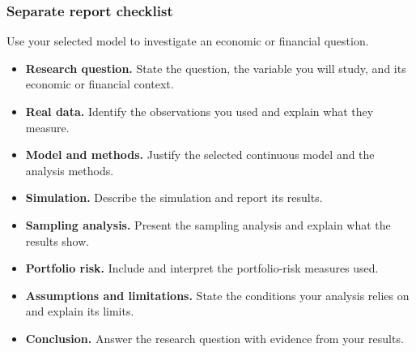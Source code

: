 \subsubsection*{Separate report checklist}
Use your selected model to investigate an economic or financial question.
\begin{itemize}[label=\(\square\),leftmargin=1.65em,itemsep=5pt]
  \item \textbf{Research question.} State the question, the variable you will study, and its economic or financial context.
  \item \textbf{Real data.} Identify the observations you used and explain what they measure.
  \item \textbf{Model and methods.} Justify the selected continuous model and the analysis methods.
  \item \textbf{Simulation.} Describe the simulation and report its results.
  \item \textbf{Sampling analysis.} Present the sampling analysis and explain what the results show.
  \item \textbf{Portfolio risk.} Include and interpret the portfolio-risk measures used.
  \item \textbf{Assumptions and limitations.} State the conditions your analysis relies on and explain its limits.
  \item \textbf{Conclusion.} Answer the research question with evidence from your results.
\end{itemize}
\par\nobreak
{}



